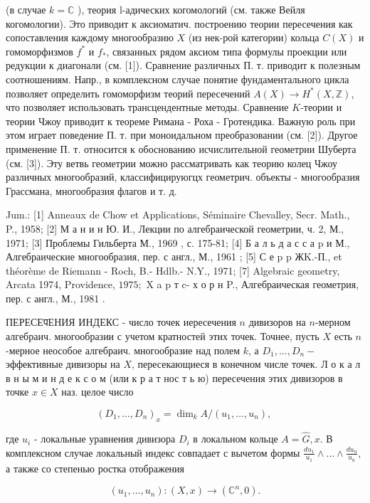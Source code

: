 \documentclass[10pt]{article}
\begin{document}
(в случае $k=\mathbb{C}$ ), теория l-адических когомологий (см. также Вейля когомологии). Это приводит к аксиоматич. построению теории пересечения как сопоставления каждому многообразию $X$ (из нек-рой категории) кольца $C(X)$ и гомоморфизмов $f^{*}$ и $f_{*}$, связанных рядом аксиом типа формулы проекции или редукции к диагонали (см. [1]). Сравнение различных П. т. приводит к полезным соотношениям. Напр., в комплексном случае понятие фундаментального цикла позволяет определить гомоморфизм теорий пересечений $A(X) \rightarrow H^{*}(X, \mathbb{Z})$, что позволяет использовать трансцендентные методы. Сравнение $K$-теории и теории Чжоу приводит к теореме Римана - Роха - Гротендика. Важную роль при этом играет поведение П. т. при моноидальном преобразовании (см. [2]). Другое применение П. т. относится к обоснованию исчислительной геометрии Шуберта (см. [3]). Эту ветвь геометрии можно рассматривать как теорию колец Чжоу различных многообразий, классифицируюгцх геометрич. объекты - многообразия Грассмана, многообразия флагов и т. д.

Jum.: [1] Anneaux de Chow et Applications, Séminaire Chevalley, Secr. Math., P., 1958; [2] М а н и н Ю. И., Лекции по алгебраической геометрии, ч. 2, М., 1971; [3] Проблемы Гильберта М., 1969 , с. 175-81; [4] Б а л ь д а с с а p и М., Алгебраические многообразия, пер. с англ., М., 1961 ; [5] С е p p ЖK.-П., et théorème de Riemann - Roch, B.- Hdlb.- N.Y., 1971; [7] Algebraic geometry, Arcata 1974, Providence, $1975 ;$ X a p т c-
х о р н P., Алгебраическая геометрия, пер. с англ., М., 1981 .

ПЕРЕСЕपЕНИЯ ИНДЕКС - число точек иересечения $n$ дивизоров на $n$-мерном алгебраич. многообразии с учетом кратностей этих точек. Точнее, пусть $X$ есть $n$-мерное неособое алгебраич. многообразие над полем $k$, а $D_{1}, \ldots, D_{n}-$ эффективные дивизоры на $X$, пересекающиеся в конечном числе точек. Л о к а л в н ы м и н д е к с о м (или к р а т нос т ь ю) пересечения этих дивизоров в точке $x \in X$ наз. целое число

\[
\left(D_{1}, \ldots, D_{n}\right)_{x}=\operatorname{dim}_{k} A /\left(u_{1}, \ldots, u_{n}\right) \text {, }
\]

где $u_{i}$ - локальные уравнения дивизора $D_{i}$ в локальном кольце $A=\widehat{G}, x$. В комплексном случае локальный индекс совпадает с вычетом формы $\frac{d u_{1}}{u_{1}} \wedge \ldots \wedge \frac{d u_{n}}{u_{n}}$, а также со степенью ростка отображения

\[
\left(u_{1}, \ldots, u_{n}\right):(X, x) \longrightarrow\left(\mathbb{C}^{n}, 0\right) .
\]
\end{document}
